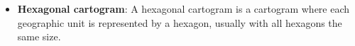 \documentclass{report}
\begin{document}
\begin{itemize}
\begin{itemize}
                \item \textbf{Derived data:} new geometry derived from the part-of-whole attribute
                \item \textbf{Tasks:} trends, comparisons, part-of-whole
                \item \textbf{How:} area marks from derived geometry, color hue/saturation/luminance
                \item \textbf{Scalability:} thousands of regions
                \item \textbf{Design choices:}
                    \begin{itemize}
                    \item Colormap
                    \item Geometric deformation
                \end{itemize}
            \end{itemize}
        \item \textbf{Hexagonal cartogram}: A hexagonal cartogram is a cartogram where each geographic unit is represented by a hexagon, usually with all hexagons the same size.

    \end{itemize}

    \pagebreak 
\end{document}
